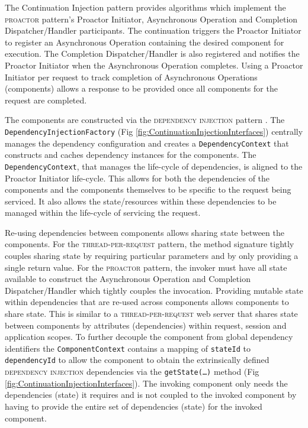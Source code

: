 \documentclass[prodmode]{style/acmlarge}
\begin{document}
The Continuation Injection pattern provides algorithms which implement the
\textsc{proactor} pattern's Proactor Initiator, Asynchronous Operation and
Completion Dispatcher/Handler participants.  The continuation triggers the
Proactor Initiator to register an Asynchronous Operation containing the desired
component for execution.  The Completion Dispatcher/Handler is also registered
and notifies the Proactor Initiator when the Asynchronous Operation completes.
Using a Proactor Initiator per request to track completion of Asynchronous
Operations (components) allows a response to be provided once all components for
the request are completed.

The components are constructed via the \textsc{dependency injection} pattern
\cite{ioc}.  The \texttt{Dependency\-InjectionFactory} (Fig
\ref{fig:ContinuationInjectionInterfaces}) centrally manages the dependency
configuration and creates a \texttt{Depend\-ency\-Context} that constructs and
caches dependency instances for the components.  The
\texttt{Dependency\-Context}, that manages the life-cycle of dependencies, is
aligned to the Proactor Initiator life-cycle.  This allows for both the
dependencies of the components and the components themselves to be specific to
the request being serviced.  It also allows the state/resources within these
dependencies to be managed within the life-cycle of servicing the request.

Re-using dependencies between components allows sharing state between the
components.  For the \textsc{thread-per-request} pattern, the method signature
tightly couples sharing state by requiring particular parameters and by only
providing a single return value.  For the \textsc{proactor} pattern, the invoker
must have all state available to construct the Asynchronous Operation and
Completion Dispatcher/Handler which tightly couples the invocation.  Providing
mutable state within dependencies that are re-used across components allows
components to share state.  This is similar to a \textsc{thread-per-request} web
server that shares state between components by attributes (dependencies) within
request, session and application scopes.  To further decouple the component from
global dependency identifiers the \texttt{ComponentContext} contains a mapping
of \texttt{stateId} to \texttt{dependencyId} to allow the component to obtain
the extrinsically defined \textsc{dependency injection} dependencies via the
\texttt{getState(\ldots)} method (Fig
\ref{fig:ContinuationInjectionInterfaces}).  The invoking component only needs
the dependencies (state) it requires and is not coupled to the invoked component
by having to provide the entire set of dependencies (state) for the invoked
component.
\end{document}

